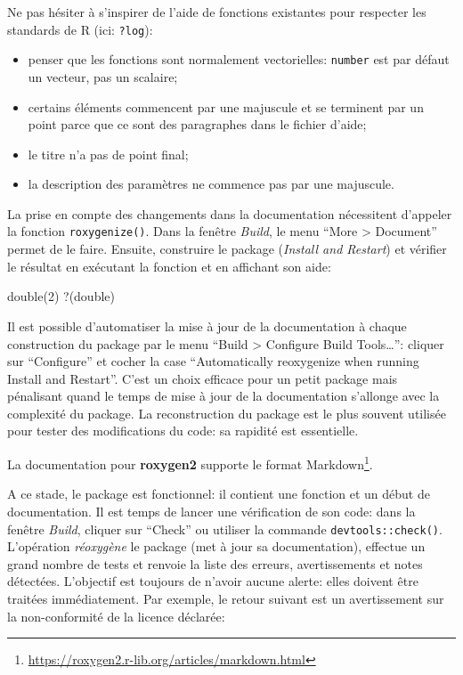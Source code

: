 \documentclass[
  11pt,
  french,
  a4paper,
  extrafontsizes,onecolumn,openright
  ]{memoir}
\newenvironment{Shaded}{\begin{snugshade}}{\end{snugshade}}
\newcommand{\AttributeTok}[1]{\textcolor[rgb]{0.77,0.63,0.00}{#1}}
\newcommand{\DecValTok}[1]{\textcolor[rgb]{0.00,0.00,0.81}{#1}}
\newcommand{\FunctionTok}[1]{\textcolor[rgb]{0.00,0.00,0.00}{#1}}
\newcommand{\NormalTok}[1]{#1}
\newcommand{\StringTok}[1]{\textcolor[rgb]{0.31,0.60,0.02}{#1}}
\providecommand{\tightlist}{%
  \setlength{\itemsep}{0pt}\setlength{\parskip}{0pt}}
\begin{document}
\normalsize

Ne pas hésiter à s'inspirer de l'aide de fonctions existantes pour respecter les standards de R (ici: \texttt{?log}):

\begin{itemize}
\tightlist
\item
  penser que les fonctions sont normalement vectorielles: \texttt{number} est par défaut un vecteur, pas un scalaire;
\item
  certains éléments commencent par une majuscule et se terminent par un point parce que ce sont des paragraphes dans le fichier d'aide;
\item
  le titre n'a pas de point final;
\item
  la description des paramètres ne commence pas par une majuscule.
\end{itemize}

La prise en compte des changements dans la documentation nécessitent d'appeler la fonction \texttt{roxygenize()}.
Dans la fenêtre \emph{Build}, le menu ``More \textgreater{} Document'' permet de le faire.
Ensuite, construire le package (\emph{Install and Restart}) et vérifier le résultat en exécutant la fonction et en affichant son aide:

\scriptsize

\begin{Shaded}
\begin{Highlighting}[]
\FunctionTok{double}\NormalTok{(}\DecValTok{2}\NormalTok{)}
\StringTok{\textasciigrave{}}\AttributeTok{?}\StringTok{\textasciigrave{}}\NormalTok{(double)}
\end{Highlighting}
\end{Shaded}

\normalsize

Il est possible d'automatiser la mise à jour de la documentation à chaque construction du package par le menu ``Build \textgreater{} Configure Build Tools\ldots{}'': cliquer sur ``Configure'' et cocher la case ``Automatically reoxygenize when running Install and Restart''.
C'est un choix efficace pour un petit package mais pénalisant quand le temps de mise à jour de la documentation s'allonge avec la complexité du package. La reconstruction du package est le plus souvent utilisée pour tester des modifications du code: sa rapidité est essentielle.

La documentation pour \textbf{roxygen2} supporte le format Markdown\footnote{\url{https://roxygen2.r-lib.org/articles/markdown.html}}.

A ce stade, le package est fonctionnel: il contient une fonction et un début de documentation.
Il est temps de lancer une vérification de son code: dans la fenêtre \emph{Build}, cliquer sur ``Check'' ou utiliser la commande \texttt{devtools::check()}.
L'opération \emph{réoxygène} le package (met à jour sa documentation), effectue un grand nombre de tests et renvoie la liste des erreurs, avertissements et notes détectées.
L'objectif est toujours de n'avoir aucune alerte: elles doivent être traitées immédiatement.
Par exemple, le retour suivant est un avertissement sur la non-conformité de la licence déclarée:
\end{document}

